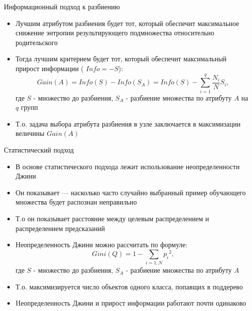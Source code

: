 \documentclass{beamer}
\begin{document}
\begin{frame}{Информационный подход к разбиению}
    \small

    \begin{itemize}
        \item Лучшим атрибутом разбиения будет тот, который обеспечит максимальное снижение энтропии результирующего подмножества относительно родительского
        \item Тогда лучшим критерием будет тот, который обеспечит максимальный прирост информации ( $Info = -S$):
        \begin{equation}
          Gain(A) = Info(S) - Info(S_A) = Info(S) - \sum_{i=1}^q \frac{N_{i}}{ N } S_i ,
        \end{equation}
        где $S$ - множество до разбиения, $S_A$ - разбиение множества по атрибуту $A$ на $q$ групп
        \item Т.о. задача выбора атрибута разбиения в узле заключается в максимизации величины $Gain(A)$
    \end{itemize}
\end{frame}


\begin{frame}{Статистический подход}
    \small

    \begin{itemize}
        \item В основе статистического подхода лежит использование неопределенности Джини
        \item Он показывает — насколько часто случайно выбранный пример обучающего множества будет распознан неправильно
        \item Т.о он показывает расстояние между целевым распределением и распределением предсказаний
        \item  Неопределенность Джини можно рассчитать по формуле:
        \begin{equation}
          Gini(Q) = 1 - \sum_{i=1, N}{p_i}^2,
        \end{equation}
        где $S$ - множество до разбиения, $S_A$ - разбиение множества по атрибуту $A$
        \item Т.о. максимизируется число объектов одного класса, попавщих в поддерево
        \item Hеопределенность Джини и прирост информации работают почти одинаково
    \end{itemize}
\end{frame}
\end{document}
